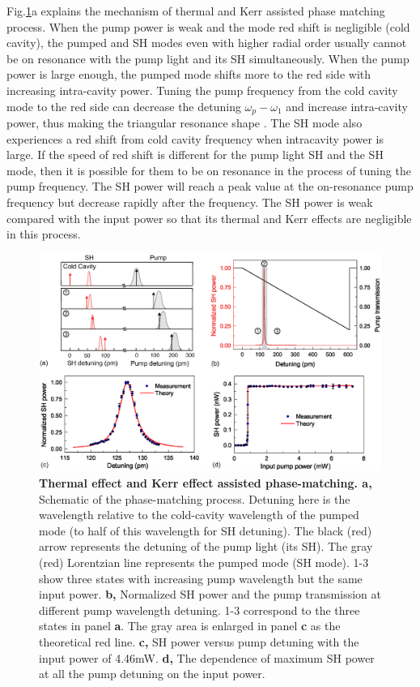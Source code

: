 \documentclass[a4paper,8pt,hyperref, twocolumn]{article}
\begin{document}
Fig.\ref{pic:Fig2}a explains the mechanism of thermal and Kerr assisted phase matching process. When the pump power is weak and the mode red shift is negligible (cold cavity), the pumped and SH modes even with higher radial order usually cannot be on resonance with the pump light and its SH simultaneously. When the pump power is large enough, the pumped mode shifts more to the red side with increasing intra-cavity power. Tuning the pump frequency from the cold cavity mode to the red side can decrease the detuning $\omega_p-\omega_1$ and increase intra-cavity power, thus making the triangular resonance shape \cite{carmon2004dynamical}. The SH mode also experiences a red shift from cold cavity frequency when intracavity power is large. If the speed of red shift is different for the pump light SH and the SH mode, then it is possible for them to be on resonance in the process of tuning the pump frequency. The SH power will reach a peak value at the on-resonance pump frequency but decrease rapidly after the frequency. The SH power is weak compared with the input power so that its thermal and Kerr effects are negligible in this process.

\begin{figure}[!ht]
\centering
\includegraphics[width=17cm]{try_ed3.eps}
\caption{\textbf{Thermal effect and Kerr effect assisted phase-matching. a, }Schematic of the phase-matching process. Detuning here is the wavelength relative to the cold-cavity wavelength of the pumped mode (to half of this wavelength for SH detuning). The black (red) arrow represents the detuning of the pump light (its SH). The gray (red) Lorentzian line represents the pumped mode (SH mode). 1-3 show three states with increasing pump wavelength but the same input power. \textbf{b, }Normalized SH power and the pump transmission at different pump wavelength detuning. 1-3 correspond to the three states in panel \textbf{a}. The gray area is enlarged in panel \textbf{c} as the theoretical red line. \textbf{c, }SH power versus pump detuning with the input power of 4.46mW. \textbf{d, }The dependence of maximum SH power at all the pump detuning on the input power.}
\label{pic:Fig2}
\end{figure}
\end{document}
